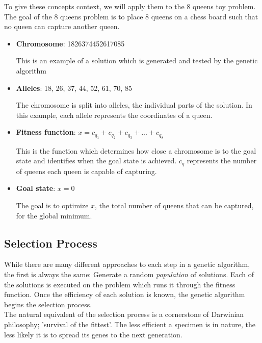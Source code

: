 \documentclass[a4paper]{article}
\begin{document}
To give these concepts context, we will apply them to the 8 queens toy problem. The goal of the 8 queens problem is to place 8 queens on a chess board such that no queen can capture another queen.
\begin{itemize}
    \item\textbf{Chromosome}: 1826374452617085
        \begin{itemize}
            This is an example of a solution which is generated and tested by the genetic algorithm
        \end{itemize}
    \item\textbf{Alleles}: 18, 26, 37, 44, 52, 61, 70, 85
        \begin{itemize}
            The chromosome is split into alleles, the individual parts of the solution. In this example, each allele represents the coordinates of a queen.
        \end{itemize}
    \item\textbf{Fitness function}: $x = c_q_1 + c_q_2 + c_q_3 + ... + c_q_8$
        \begin{itemize}
            This is the function which determines how close a chromosome is to the goal state and identifies when the goal state is achieved. $c_{q}$ represents the number of queens each queen is capable of capturing.
        \end{itemize}
    \item\textbf{Goal state}: $x = 0$
        \begin{itemize}
            The goal is to optimize $x$, the total number of queens that can be captured, for the global minimum.
        \end{itemize}
\end{itemize}

\subsection{Selection Process}
While there are many different approaches to each step in a genetic algorithm, the first is always the same: Generate a random \textit{population} of solutions. Each of the solutions is executed on the problem which runs it through the fitness function. Once the efficiency of each solution is known, the genetic algorithm begins the selection process.\\

The natural equivalent of the selection process is a cornerstone of Darwinian philosophy; 'survival of the fittest'. The less efficient a specimen is in nature, the less likely it is to spread its genes to the next generation.\\
\end{document}
